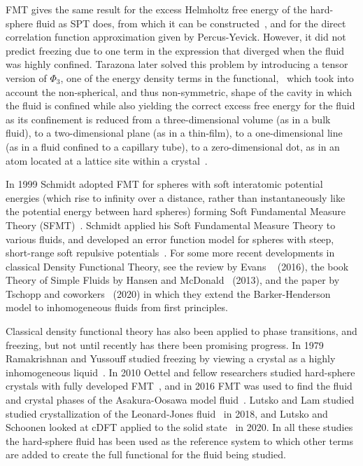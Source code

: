\documentclass[double,12pt]{beavtex}
\begin{document}
FMT gives the same result for the excess Helmholtz free energy of the hard-sphere fluid as 
SPT does, from which it can be constructed~\cite{rosenfeld1989,Hansen,santos2012phi3},
and for the direct correlation function approximation given by Percus-Yevick. 
However, it did not predict freezing due to one term in the expression that
diverged when the fluid was highly confined.  
Tarazona later solved this problem by introducing a tensor version of $\Phi_3$,
one of the energy density terms 
in the functional,~\cite{tarazonaphi3, santos2012phi3} 
which took into account the non-spherical, and thus 
non-symmetric, shape of the cavity in which the fluid is confined 
while also yielding the correct excess free energy for the fluid as its 
confinement is reduced from a three-dimensional volume (as in a bulk fluid), 
to a two-dimensional plane (as in a thin-film), to a one-dimensional 
line (as in a fluid confined to a capillary tube), to a zero-dimensional 
dot, as in an atom located at a lattice site within a crystal~\cite{rothreview}. 

In 1999 Schmidt adopted FMT for spheres with soft 
interatomic potential energies
(which rise to infinity over a distance, rather than instantaneously 
like the potential energy between hard spheres)
forming Soft Fundamental Measure Theory (SFMT)~\cite{schmidt1999density}. 
Schmidt applied his Soft Fundamental Measure Theory to various fluids, 
and developed 
an error function model 
for spheres with steep, short-range soft repulsive 
potentials~\cite{schmidt2000fluid}.
For some more recent developments in classical Density Functional Theory, 
see the review by Evans ~\cite{evansreview} (2016), the book 
Theory of Simple Fluids by Hansen and McDonald~\cite{Hansen} (2013), 
and the paper by Tschopp and coworkers~\cite{BHextended} (2020) in which 
they extend the Barker-Henderson model to inhomogeneous 
fluids from first principles.

Classical density functional theory has also been applied 
to phase transitions, and freezing, but not until recently has there
been promising progress. In 1979 Ramakrishnan and Yussouff studied 
freezing by viewing a 
crystal as a highly inhomogeneous liquid~\cite{ramakrishnanandyussouff}. 
In 2010 Oettel and fellow researchers studied hard-sphere crystals with 
fully developed FMT~\cite{Oettel2010}, and 
in 2016 FMT was used to find the fluid and crystal phases of the 
Asakura-Oosawa model fluid~\cite{asakuraoosawa}. 
Lutsko and Lam studied studied crystallization of the Leonard-Jones 
fluid~\cite{lutsko} in 2018, and Lutsko and Schoonen looked at cDFT applied 
to the solid state~\cite{lutskoschoonen2020} in 2020.
In all these studies the hard-sphere fluid has been used as the reference 
system to which other terms are added to create 
the full functional for the fluid being studied.
\end{document}
